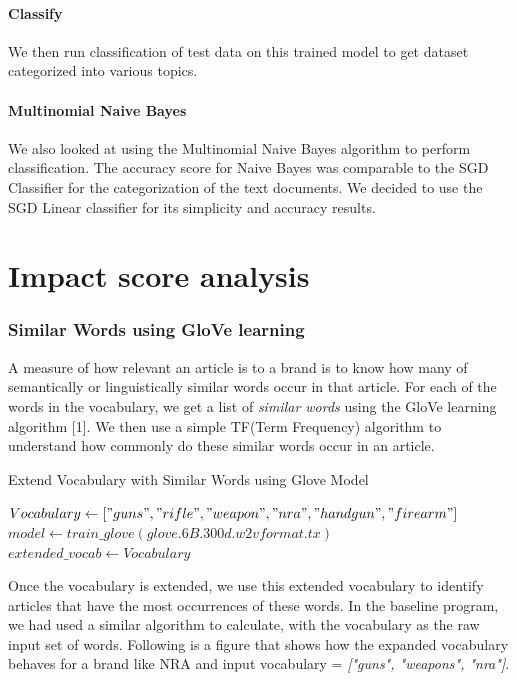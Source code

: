 \documentclass[paper=a4, fontsize=11pt]{scrartcl}
\numberwithin{equation}{section}		%
\numberwithin{figure}{section}			%
\numberwithin{table}{section}				%
\begin{document}
\paragraph{Classify} We then run classification of test data on this trained model to get dataset categorized into various topics.

\paragraph{Multinomial Naive Bayes} We also looked at using the Multinomial Naive Bayes algorithm to perform classification. The accuracy score for Naive Bayes was comparable to the SGD Classifier for the categorization of the text documents.
We decided to use the SGD Linear classifier for its simplicity and accuracy results.



\section{Impact score analysis}
\subsubsection {Similar Words using GloVe learning}
A measure of how relevant an article is to a brand is to know how many of semantically or linguistically similar words occur in that article. For each of the words in the vocabulary, we get a list of \textit{similar words} using the GloVe learning algorithm [1]. We then use a simple TF(Term Frequency) algorithm to understand how commonly do these similar words occur in an article.

\begin{center}
\begin{algorithm}
  \caption{Extend Vocabulary with Similar Words using Glove Model}

 $Vocabulary \gets ["guns", "rifle", "weapon", "nra", "handgun", "firearm"] $\;
 $model \gets train\_glove(\textit{glove.6B.300d.w2vformat.tx}) $\;
  {
      $extended\_vocab \gets Vocabulary $\;
    \;
  }
\end{algorithm}
\end{center}
Once the vocabulary is extended, we use this extended vocabulary to identify articles that have the most occurrences of these words. In the baseline program, we had used a similar algorithm to calculate, with the vocabulary as the raw input set of words. Following is a figure that shows how the expanded vocabulary behaves for a brand like NRA and input vocabulary = \textit {["guns", "weapons", "nra"]}.
\end{document}
